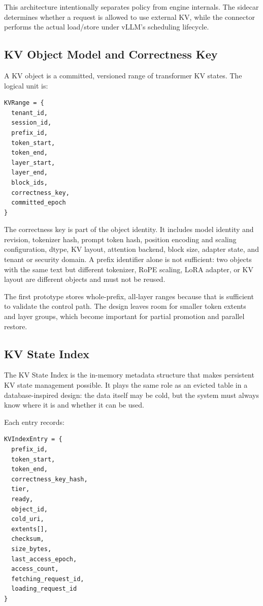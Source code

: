 \documentclass[sigconf,review,anonymous]{acmart}
\begin{document}
This architecture intentionally separates policy from engine internals. The
sidecar determines whether a request is allowed to use external KV, while the
connector performs the actual load/store under vLLM's scheduling lifecycle.

\subsection{KV Object Model and Correctness Key}

A KV object is a committed, versioned range of transformer KV states. The
logical unit is:
\begin{lstlisting}
KVRange = {
  tenant_id,
  session_id,
  prefix_id,
  token_start,
  token_end,
  layer_start,
  layer_end,
  block_ids,
  correctness_key,
  committed_epoch
}
\end{lstlisting}

The correctness key is part of the object identity. It includes model identity
and revision, tokenizer hash, prompt token hash, position encoding and scaling
configuration, dtype, KV layout, attention backend, block size, adapter state,
and tenant or security domain. A prefix identifier alone is not sufficient: two
objects with the same text but different tokenizer, RoPE scaling, LoRA adapter,
or KV layout are different objects and must not be reused.

The first prototype stores whole-prefix, all-layer ranges because that is
sufficient to validate the control path. The design leaves room for smaller
token extents and layer groups, which become important for partial promotion
and parallel restore.

\subsection{KV State Index}

The KV State Index is the in-memory metadata structure that makes persistent KV
state management possible. It plays the same role as an evicted table in a
database-inspired design: the data itself may be cold, but the system must
always know where it is and whether it can be used.

Each entry records:
\begin{lstlisting}
KVIndexEntry = {
  prefix_id,
  token_start,
  token_end,
  correctness_key_hash,
  tier,
  ready,
  object_id,
  cold_uri,
  extents[],
  checksum,
  size_bytes,
  last_access_epoch,
  access_count,
  fetching_request_id,
  loading_request_id
}
\end{lstlisting}
\end{document}
